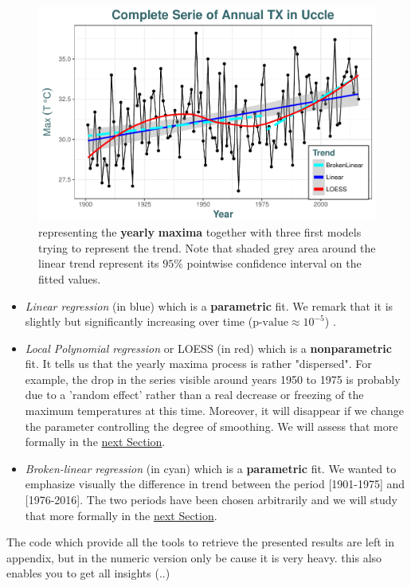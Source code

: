 \begin{figure}[!htb]
	\centering\includegraphics[width=.8\linewidth]{gg12.pdf}\caption{representing the \textbf{yearly} \textbf{maxima} together with three first models trying to represent the trend. Note that shaded grey area around the linear trend represent its $95\%$ pointwise confidence interval on the fitted values. }%
\label{first_fig}
\end{figure}


\begin{itemize}
\item \emph{Linear regression } (in blue) which is a \textbf{parametric} fit. We remark that it is slightly but significantly increasing over time ($\text{p-value}\approx 10^{-5}$) . 
\item \emph{Local Polynomial regression } or LOESS (in red) which is a \textbf{nonparametric} fit. It tells us that the yearly maxima process is rather "dispersed". For example, the drop in the series visible around years 1950 to 1975 is probably due to a 'random effect' rather than a real decrease or freezing of the maximum temperatures at this time. Moreover, it will disappear if we change the parameter controlling the degree of smoothing. We will assess that more formally in the \hyperref[sec:splines]{next Section}.
\item \emph{Broken-linear regression} (in cyan) which is a \textbf{parametric} fit. We wanted to emphasize visually the difference in trend between the period [1901-1975] and [1976-2016]. The two periods have been chosen arbitrarily and we will study that more formally in the \hyperref[sec:splines]{next Section}.
\end{itemize}


The code which provide all the tools to retrieve the presented results are left in appendix, but in the numeric version only be cause it is very heavy. this also enables you to get all insights (..)



